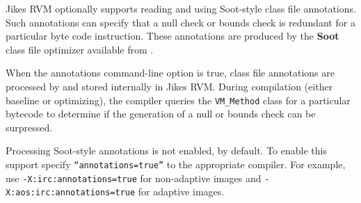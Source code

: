 Jikes RVM optionally supports reading and using Soot-style class file
annotations.  Such annotations can specify that a null check or bounds
check is redundant for a particular byte code instruction.  These
annotations are produced by the {\bf Soot} class file optimizer
available from
\xlink{\SOOTURL}{\SOOTURL}.  

When the annotations command-line option is true, class file
annotations are processed by  and stored internally in Jikes RVM.
During compilation (either baseline or optimizing), the compiler 
queries the {\tt VM\_Method} class for a particular bytecode to
determine if the generation of a null or bounds check can be
surpressed. 

Processing Soot-style annotations is not enabled, by default.  To
enable this support specify {\tt ``annotations=true''} to the
appropriate compiler.  For example, use {\tt -X:irc:annotations=true}
for non-adaptive images and {\tt -X:aos:irc:annotations=true} for
adaptive images.

